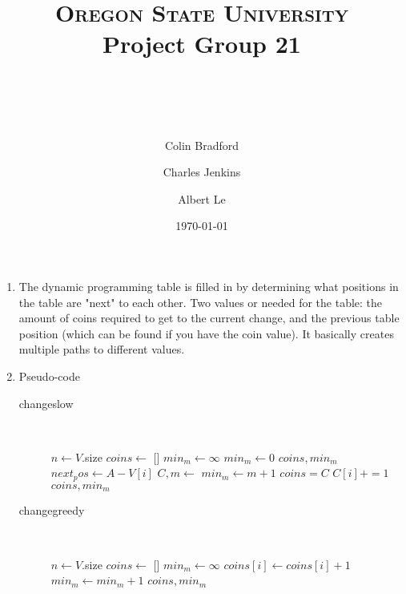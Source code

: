 \documentclass[paper=a4, fontsize=11pt]{scrartcl} %
\title{ 
    \normalfont \normalsize 
    \textsc{Oregon State University} \\ [25pt]
    \large Project Group 21
    \horrule{0.5pt} \\[0.4cm] %
    \huge \hwtitle \\ %
    \horrule{2pt} \\[0.5cm] %
}
\author{
    Colin Bradford
    \and
    Charles Jenkins
    \and
    Albert Le
} %
\date{\normalsize\today} %
\numberwithin{equation}{section} %
\numberwithin{figure}{section} %
\numberwithin{table}{section} %
\begin{document}
\maketitle %

\begin{enumerate}
    \item The dynamic programming table is filled in by determining what positions
    in the table are "next" to each other. Two values or needed for the table:
    the amount of coins required to get to the current change, and the previous
    table position (which can be found if you have the coin value). It basically
    creates multiple paths to different values.

    \item Pseudo-code
    \begin{description}
        \item[changeslow] \hfill \\
        \begin{algorithmic}
                \State $n \gets V$.size
                \State $coins \gets$ []
                \State $min_m \gets \infty$
                    \State $min_m \gets 0$
                    \Return $coins, min_m$
                \EndIf
                    \State $next_pos \gets A - V[i]$
                        \State $C, m \gets$ 
                            \State $min_m \gets m + 1$
                            \State $coins = C$
                            \State $C[i] += 1$
                        \EndIf
                    \EndIf
                \EndFor
                \State \Return $coins, min_m$
            \EndFunction
        \end{algorithmic}

        \item[changegreedy] \hfill \\
        \begin{algorithmic}
                \State $n \gets V$.size
                \State $coins \gets$ []
                \State $min_m \gets \infty$
                        \State $coins[i] \gets coins[i] + 1$
                        \State $min_m \gets min_m + 1$
                    \EndWhile
                \EndFor
                \Return $coins, min_m$
            \EndFunction
        \end{algorithmic}


\end{description}
\end{enumerate}
\end{document}
